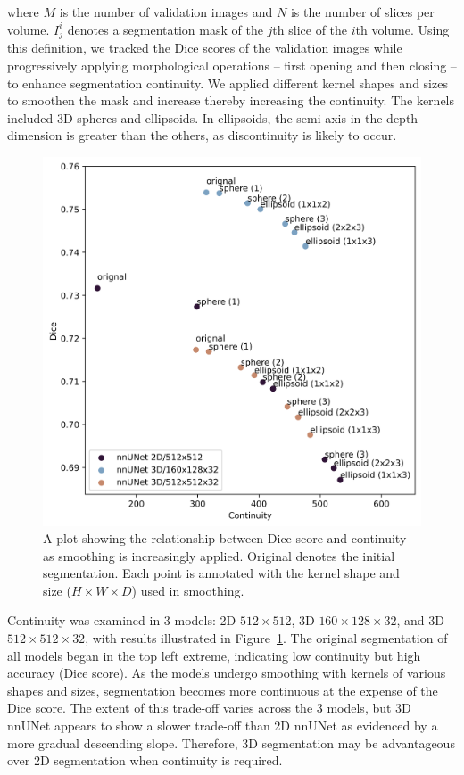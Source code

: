 \documentclass[a4paper,11pt,oneside]{report}
\begin{document}
where $M$ is the number of validation images and $N$ is the number of slices per volume. $I_{j}^{i}$ denotes a segmentation mask of the $j$th slice of the $i$th volume. Using this definition, we tracked the Dice scores of the validation images while progressively applying morphological operations -- first opening and then closing -- to enhance segmentation continuity. We applied different kernel shapes and sizes to smoothen the mask and increase thereby increasing the continuity. The kernels included 3D spheres and ellipsoids. In ellipsoids, the semi-axis in the depth dimension is greater than the others, as discontinuity is likely to occur. 

\begin{figure}[htb]
    \centering
    \includegraphics[width=0.5\linewidth]{figures/result_nnunet_dice_and_continuity.png}
    \caption{A plot showing the relationship between Dice score and continuity as smoothing is increasingly applied. Original denotes the initial segmentation. Each point is annotated with the kernel shape and size ($H\times W\times D$) used in smoothing.}
    \label{fig:nnunet-continuity-vs-correctness}
\end{figure}

Continuity was examined in 3 models: 2D $512\times 512$, 3D $160\times 128\times 32$, and 3D $512\times 512\times 32$, with results illustrated in Figure~\ref{fig:nnunet-continuity-vs-correctness}. The original segmentation of all models began in the top left extreme, indicating low continuity but high accuracy (Dice score). As the models undergo smoothing with kernels of various shapes and sizes, segmentation becomes more continuous at the expense of the Dice score. The extent of this trade-off varies across the 3 models, but 3D nnUNet appears to show a slower trade-off than 2D nnUNet as evidenced by a more gradual descending slope. Therefore, 3D segmentation may be advantageous over 2D segmentation when continuity is required.
\end{document}
